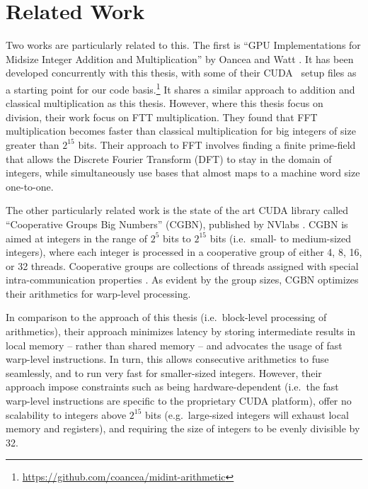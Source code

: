 \section{Related Work}
\label{sec:rel}

Two works are particularly related to this. The first is ``GPU Implementations
for Midsize Integer Addition and Multiplication'' by Oancea and Watt
\cite{oancea2024gpu}. It has been developed concurrently with this thesis, with
some of their CUDA \cpp\ setup files as a starting point for our code
basis.\footnote{\url{https://github.com/coancea/midint-arithmetic}} It shares a
similar approach to addition and classical multiplication as this
thesis. However, where this thesis focus on division, their work focus on FTT
multiplication. They found that FFT multiplication becomes faster than classical
multiplication for big integers of size greater than $2^{15}$ bits. Their
approach to FFT involves finding a finite prime-field that allows the Discrete
Fourier Transform (DFT) to stay in the domain of integers, while simultaneously
use bases that almost maps to a machine word size one-to-one.

The other particularly related work is the state of the art CUDA library called
``Cooperative Groups Big Numbers'' (CGBN), published by NVlabs \cite{CGBN}. CGBN
is aimed at integers in the range of $2^5$ bits to $2^{15}$ bits (i.e.\ small-
to medium-sized integers), where each integer is processed in a cooperative
group of either 4, 8, 16, or 32 threads. Cooperative groups are collections of
threads assigned with special intra-communication properties
\cite{cudaguide}. As evident by the group sizes, CGBN optimizes their
arithmetics for warp-level processing.

In comparison to the approach of this thesis (i.e.\ block-level processing of
arithmetics), their approach minimizes latency by storing intermediate results
in local memory -- rather than shared memory -- and advocates the usage of fast
warp-level instructions. In turn, this allows consecutive arithmetics to fuse
seamlessly, and to run very fast for smaller-sized integers. However, their
approach impose constraints such as being hardware-dependent (i.e.\ the fast
warp-level instructions are specific to the proprietary CUDA platform), offer no
scalability to integers above $2^{15}$ bits (e.g.\ large-sized integers will
exhaust local memory and registers), and requiring the size of integers to be
evenly divisible by 32. \bigskip

